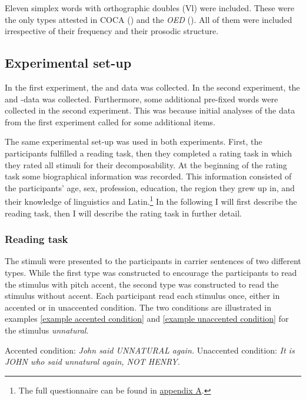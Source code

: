 Eleven simplex words with orthographic doubles (Vl) were included. These were the only types attested in COCA (\citealt{Davies.20082014}) and the \textit{OED} (\citealt{OED.2013}). 
All of them were included irrespective of their frequency and their prosodic structure. 





\subsection{Experimental set-up}

In the first experiment, the  and data was collected.
In the second experiment, the  and -data was collected. Furthermore, some additional pre-fixed words were collected in the second experiment. 
This was because initial analyses of the data from the first experiment called for some additional items.
 
 The same experimental set-up was used in both experiments. First, the participants fulfilled a reading task, then they completed a rating task in which they rated all stimuli for their decomposability. 
 At the beginning of the rating task some biographical information was recorded. This information consisted of the participants' age, sex, profession, education, the region they grew up in, and their knowledge of linguistics and Latin.\footnote{The full questionnaire can be found in \hyperref[Appendix A: Decomposability Rating]{appendix A}.}  In the following I will first describe the reading task, then I will describe the rating task in further detail. 

\subsubsection{Reading task}


The stimuli were presented to the participants in carrier sentences of two different types. 
While the first type was constructed to encourage the participants to read the stimulus with pitch accent, the second type was constructed to read the stimulus without accent. Each participant read each stimulus once, either in accented or in unaccented condition. 
The two conditions are illustrated in examples \ref{example accented condition}  and \ref{example unaccented condition} for the stimulus \textit{unnatural}.  


\begin{exe} 
	\ex \label{example accented condition} Accented condition:  \hspace*{.5cm}\textit{John said UNNATURAL again.}
	\ex \label{example unaccented condition} Unaccented condition: \hspace*{0cm} \textit{It is JOHN who said unnatural again, NOT HENRY.}
\end{exe}

